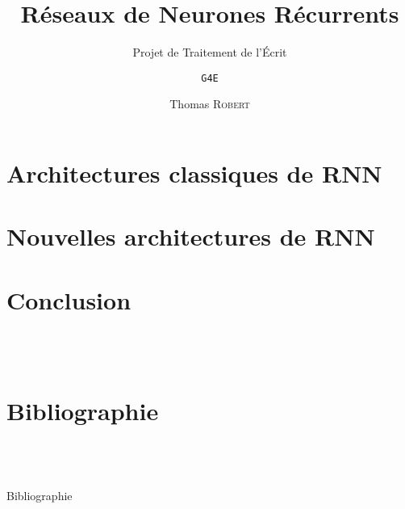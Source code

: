 \documentclass[compress,xcolor=table]{beamer}
\title{\LARGE Réseaux de Neurones Récurrents\newline{\Large \em Recurrent Neural Networks (RNN)\newline~}}
\subtitle{\large Projet de Traitement de l'Écrit}
\date{\formatdate{20}{2}{2015}}
\author{\texttt{G4E} \and Thomas \textsc{Robert}}
\institute{Université de Rouen}
\begin{document}


\section{Architectures classiques de RNN}


\section{Nouvelles architectures de RNN}


\section{Conclusion}
\subsection*{~~~~~~~~~~~~~~~}


\section{Bibliographie}
\subsection*{~~~~~~~~~~~~~~~}
\begin{frame}[allowframebreaks]{Bibliographie}
%
%
\printbibliography[heading=none]
 \end{frame}
\end{document}
